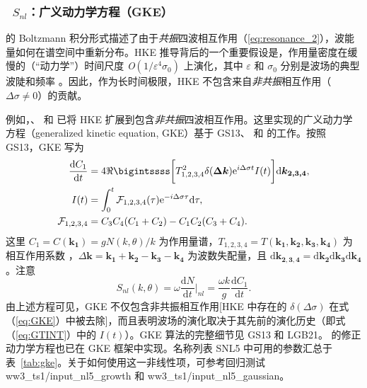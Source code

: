 \vsssub
\subsubsection{~$S_{nl}$：广义动力学方程（GKE）} \label{sec:NL5}
\vsssub


\noindent
\citet[][也称为动力学方程；式（\ref{eq:HKE}），下文记为 HKE]{art:Has62} 的 Boltzmann 积分形式描述了由于\emph{共振}四波相互作用（\ref{eq:resonance_2}），波能量如何在谱空间中重新分布。HKE 推导背后的一个重要假设是，作用量密度在缓慢的（“动力学”）时间尺度 \textit{O}$(1 / \varepsilon^{4} \sigma_0)$ 上演化，其中 $\varepsilon$ 和 $\sigma_0$ 分别是波场的典型波陡和频率 \citep{Annenkov2006}。因此，作为长时间极限，HKE 不包含来自\emph{非共振}相互作用（$\Delta \sigma \neq 0$）的贡献。

例如，\citet{Janssen2003}、\citet{Annenkov2006} 和 \citet[][下文记为 GS13]{Gramstad2013} 已将 HKE 扩展到包含\emph{非共振}四波相互作用。这里实现的广义动力学方程（generalized kinetic equation, GKE）基于 GS13、\citet{Gramstad2016} 和 \citet[][下文记为 LGB21]{Liu2021JFM} 的工作。按照 GS13，GKE 写为
%
\begin{align}
\frac{\mathrm{d} C_1}{\mathrm{d} t} &= 4 \Re \bigintssss \bigg[ T^2_{1, 2, 3, 4} \delta (\boldsymbol{\Delta k}) \/\mathrm{e}^{i\Delta \sigma t} I(t) \/  \bigg] \mathrm{d} \boldsymbol{k_{2, 3, 4}}, \label{eq:GKE}\\
%
I(t) &= \int_{0}^{t} \mathcal{F}_{1, 2, 3, 4} (\tau) \mathrm{e}^{-i\Delta \sigma \tau } \mathrm{d} \tau, \label{eq:GTINT}\\
%
\mathcal{F}_{1, 2, 3, 4} &= C_3 C_4 (C_1 + C_2) - C_1 C_2 (C_3 + C_4). \label{eq:GPROD}
\end{align}
%
这里 $C_1 = C(\boldsymbol{k_1}) = g N(k, \theta) / k$ 为作用量谱，$T_{1, 2, 3, 4} = T(\boldsymbol{k_1}, \boldsymbol{k_2}, \boldsymbol{k_3}, \boldsymbol{k_4})$ 为相互作用系数 \citep{art:Kra94, art:Jan09}，$\Delta \boldsymbol{k} = \boldsymbol{k_1} + \boldsymbol{k_2} - \boldsymbol{k_3} - \boldsymbol{k_4}$ 为波数失配量，且 $\mathrm{d} \boldsymbol{k_{2,3,4}} = \mathrm{d} \boldsymbol{k_2} \mathrm{d} \boldsymbol{k_3} \mathrm{d} \boldsymbol{k_4}$。注意
\begin{equation}
S_{nl}(k, \theta) = \omega \frac{\mathrm{d} N}{\mathrm{d}t} \bigg\rvert_{nl} = \frac{\omega k}{g} \frac{\mathrm{d} C_1}{\mathrm{d} t}.
\label{eq:GSnl}
\end{equation}
由上述方程可见，GKE 不仅包含非共振相互作用[HKE 中存在的 $\delta (\Delta \sigma)$ 在式（\ref{eq:GKE}）中被去除]，而且表明波场的演化取决于其先前的演化历史（即式（\ref{eq:GTINT}）中的 $I(t)$）。GKE 算法的完整细节见 GS13 和 LGB21。 \citet{Janssen2003} 的修正动力学方程也已在 GKE 框架中实现。名称列表 {\F SNL5} 中可用的参数汇总于表~\ref{tab:gke}。关于如何使用这一非线性项，可参考回归测试 {\code ww3\_ts1/input\_nl5\_growth} 和 {\code ww3\_ts1/input\_nl5\_gaussian}。


